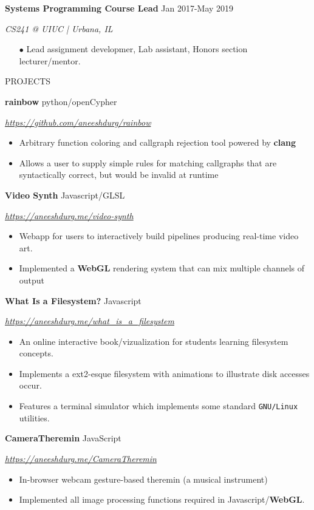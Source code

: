\documentclass[paper=a4,fontsize=11pt]{scrartcl} %
\newcommand{\sepspace}{\vspace*{1em}}		%
\newcommand{\NewPart}[1]{ \noindent \large \usefont{OT1}{phv}{b}{n}\uppercase{#1} \normalfont \normalsize}
\newcommand{\EducationEntry}[4]{
		\noindent \textbf{#1}     %
			\hfill#2 \par  %
		\noindent \textit{#3} \par        %
		\noindent\hangafter=0 \small #4 %
		\normalsize \par}
\begin{document}
\begin{minipage}[t]{0.78\textwidth}
\EducationEntry{Systems Programming Course Lead}{Jan 2017-May 2019}{CS241 @ UIUC | Urbana, IL}{
\begin{itemize}
  \item[$\bullet$] Lead assignment developmer, Lab assistant, Honors section lecturer/mentor.
\end{itemize}
}

\sepspace
\NewPart{Projects}{}

\EducationEntry{rainbow}{python/openCypher}{\url{https://github.com/aneeshdurg/rainbow}}{
\begin{itemize}
\item Arbitrary function coloring and callgraph rejection tool powered by \textbf{clang}
\item Allows a user to supply simple rules for matching callgraphs that are syntactically correct, but would be invalid at runtime
\end{itemize}
}

\EducationEntry{Video Synth}{Javascript/GLSL}{\url{https://aneeshdurg.me/video-synth}}{
\begin{itemize}
\item Webapp for users to interactively build pipelines producing real-time video art.
\item Implemented a \textbf{WebGL} rendering system that can mix multiple channels of output
\end{itemize}
}

\EducationEntry{What Is a Filesystem?}{Javascript}{\url{https://aneeshdurg.me/what_is_a_filesystem}}{
\begin{itemize}
\item An online interactive book/vizualization for students learning filesystem concepts.
\item Implements a ext2-esque filesystem with animations to illustrate disk accesses occur.
\item Features a terminal simulator which implements some standard \texttt{GNU/Linux} utilities.%
\end{itemize}
}
\EducationEntry{CameraTheremin}{JavaScript}{\url{https://aneeshdurg.me/CameraTheremin}}{
\begin{itemize}
\item In-browser webcam gesture-based theremin (a musical instrument)
\item Implemented all image processing functions required in Javascript/\textbf{WebGL}.
\end{itemize}
}
\end{minipage}
\end{document}

